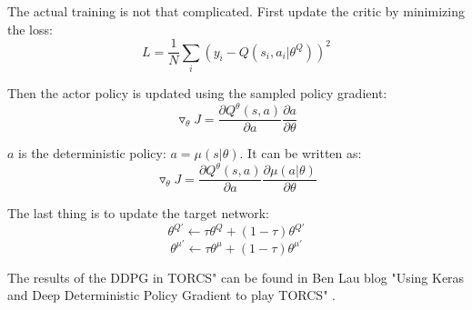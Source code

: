 The actual training is not that complicated. First update the critic by minimizing the loss:
\begin{equation}
L = \frac{1}{N} \sum_{i} (y_i - Q(s_i,a_i|\theta^Q))^2
\end{equation}

Then the actor policy is updated using the sampled policy gradient:
\begin{equation}
\triangledown_\theta J = \frac{\partial Q^\theta(s,a)}{\partial a} \frac{\partial a }{\partial \theta}
\end{equation}

$a$ is the deterministic policy: $a=\mu(s|\theta)$. It can be written as:
\begin{equation}
\triangledown_\theta J = \frac{\partial Q^\theta(s,a)}{\partial a} \frac{\partial \mu(a|\theta) }{\partial \theta}
\end{equation}

The last thing is to update the target network:
\begin{equation}
\theta^{Q'} \leftarrow \tau \theta^Q + (1-\tau)\theta^{Q'} 
\end{equation}
\begin{equation}
\theta^{\mu'} \leftarrow \tau \theta^\mu + (1-\tau)\theta^{\mu'} 
\end{equation}

The results of the DDPG in TORCS" can be found in Ben Lau blog "Using Keras and Deep Deterministic Policy Gradient to play TORCS" \cite{DDPG_Torcs}.
